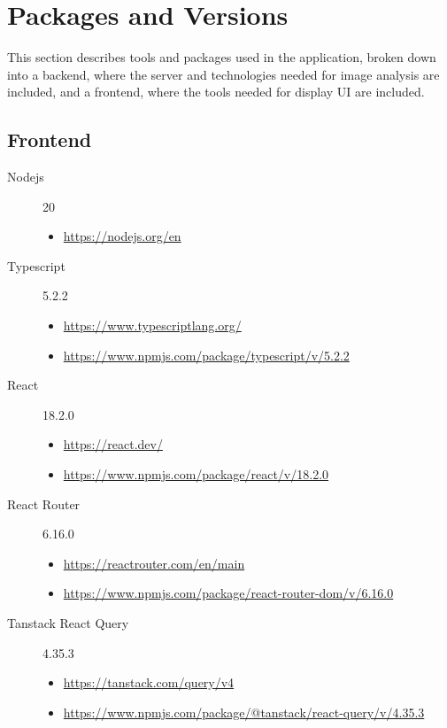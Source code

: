 \chapter{Packages and Versions} \label{chr:packagesAndVersions}
This section describes tools and packages used in the application, broken down into a backend, where the server and technologies needed for image analysis are included, and a frontend, where the tools needed for display UI are included.

\section*{Frontend}

\begin{description}

    \item[Nodejs] 20
    \begin{itemize}
        \item \url{https://nodejs.org/en}
    \end{itemize}

    \item[Typescript] 5.2.2
    \begin{itemize}
        \item \url{https://www.typescriptlang.org/}
        \item \url{https://www.npmjs.com/package/typescript/v/5.2.2}
    \end{itemize}

    \item[React] 18.2.0
    \begin{itemize}
        \item \url{https://react.dev/}
        \item \url{https://www.npmjs.com/package/react/v/18.2.0}
    \end{itemize}

    \item[React Router] 6.16.0
    \begin{itemize}
        \item \url{https://reactrouter.com/en/main}
        \item \url{https://www.npmjs.com/package/react-router-dom/v/6.16.0}
    \end{itemize}

    \item[Tanstack React Query] 4.35.3
    \begin{itemize}
        \item \url{https://tanstack.com/query/v4}
        \item \url{https://www.npmjs.com/package/@tanstack/react-query/v/4.35.3}
    \end{itemize}


\end{description}
